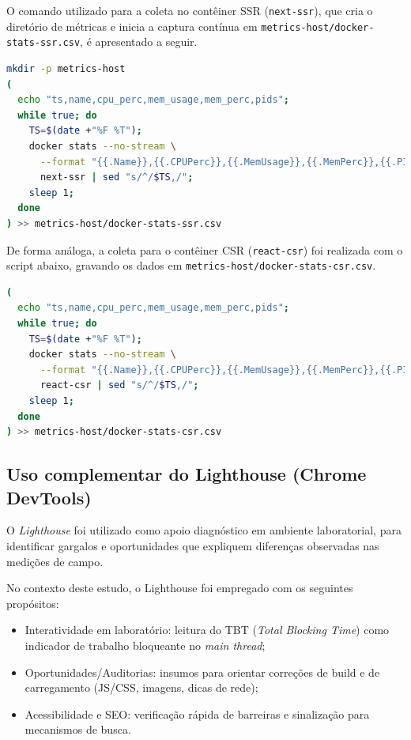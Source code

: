 O comando utilizado para a coleta no contêiner SSR (\texttt{next-ssr}), que cria o diretório de métricas e inicia a captura contínua em \texttt{metrics-host/docker-stats-ssr.csv}, é apresentado a seguir.

\begin{lstlisting}[language=bash,caption={Captura de CPU/RAM do contêiner SSR e exportação para CSV}]
mkdir -p metrics-host
(
  echo "ts,name,cpu_perc,mem_usage,mem_perc,pids";
  while true; do
    TS=$(date +"%F %T");
    docker stats --no-stream \
      --format "{{.Name}},{{.CPUPerc}},{{.MemUsage}},{{.MemPerc}},{{.PIDs}}" \
      next-ssr | sed "s/^/$TS,/";
    sleep 1;
  done
) >> metrics-host/docker-stats-ssr.csv
\end{lstlisting}

De forma análoga, a coleta para o contêiner CSR (\texttt{react-csr}) foi realizada com o script abaixo, gravando os dados em \texttt{metrics-host/docker-stats-csr.csv}.

\begin{lstlisting}[language=bash,caption={Captura de CPU/RAM do contêiner CSR e exportação para CSV}]
(
  echo "ts,name,cpu_perc,mem_usage,mem_perc,pids";
  while true; do
    TS=$(date +"%F %T");
    docker stats --no-stream \
      --format "{{.Name}},{{.CPUPerc}},{{.MemUsage}},{{.MemPerc}},{{.PIDs}}" \
      react-csr | sed "s/^/$TS,/";
    sleep 1;
  done
) >> metrics-host/docker-stats-csr.csv
\end{lstlisting}

\subsection{Uso complementar do Lighthouse (Chrome DevTools)}
\label{ssec:lighthouse}

O \textit{Lighthouse} foi utilizado como apoio diagnóstico em ambiente laboratorial, para identificar gargalos e oportunidades que expliquem diferenças observadas nas medições de campo.

No contexto deste estudo, o Lighthouse foi empregado com os seguintes propósitos:
\begin{itemize}
  \item Interatividade em laboratório: leitura do TBT (\textit{Total Blocking Time}) como indicador de trabalho bloqueante no \textit{main thread};
  \item Oportunidades/Auditorias: insumos para orientar correções de build e de carregamento (JS/CSS, imagens, dicas de rede);
  \item Acessibilidade e SEO: verificação rápida de barreiras e sinalização para mecanismos de busca.
\end{itemize}

